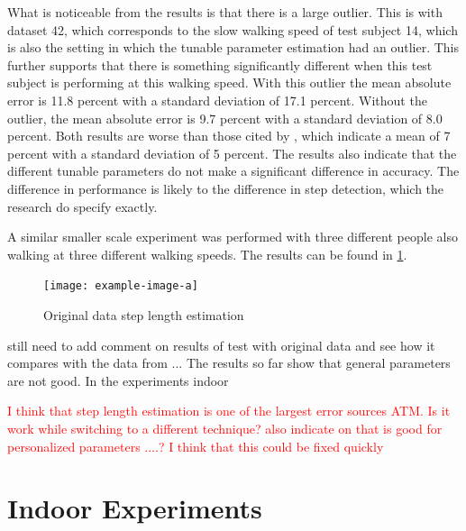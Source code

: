What is noticeable from the results is that there is a large outlier. This is with dataset 42, which corresponds to the slow walking speed of test subject 14, which is also the setting in which the tunable parameter estimation had an outlier. This further supports that there is something significantly different when this test subject is performing at this walking speed. With this outlier the mean absolute error is 11.8 percent with a standard deviation of 17.1 percent. Without the outlier, the mean absolute error is 9.7 percent with a standard deviation of 8.0 percent. Both results are worse than those cited by \cite{Vezocnik2019}, which indicate a mean of 7 percent with a standard deviation of 5 percent.
The results also indicate that the different tunable parameters do not make a significant difference in accuracy. The difference in performance is likely to the difference in step detection, which the research do specify exactly. \par 
A similar smaller scale experiment was performed with three different people also walking at three different walking speeds. The results can be found in \cref{fig:step_length_personal_testing}. 
\begin{figure}[H]
	\centering
	\texttt{[image: example-image-a]}
	\caption{Original data step length estimation}
	\label{fig:step_length_personal_testing}
\end{figure}

{\color{cyan} still need to add comment on results of test with original data and see how it compares with the data from \cite{Vezocnik2019}... The results so far show that general parameters are not good. In the experiments indoor }

\textcolor{red}{I think that step length estimation is one of the largest error sources ATM. Is it work while switching to a different technique? \citet{Vezocnik2019} also indicate on that is good for personalized parameters ....? I think that this could be fixed quickly}

\section{Indoor Experiments}


